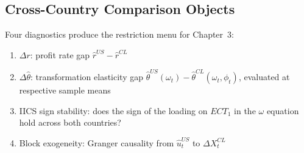 \subsection{Cross-Country Comparison Objects}
\label{app:cl:cross_country}

Four diagnostics produce the restriction menu for Chapter~3:
\begin{enumerate}
\item $\Delta r$: profit rate gap
$\hat{r}^{US} - \hat{r}^{CL}$
\item $\Delta\hat{\theta}$: transformation elasticity gap
$\hat{\theta}^{US}(\omega_t) - \hat{\theta}^{CL}(\omega_t,
\phi_t)$, evaluated at respective sample means
\item IICS sign stability: does the sign of the loading on
$ECT_1$ in the $\omega$ equation hold across both countries?
\item Block exogeneity: Granger causality from
$\hat{u}_t^{US}$ to $\Delta X_t^{CL}$
\end{enumerate}



